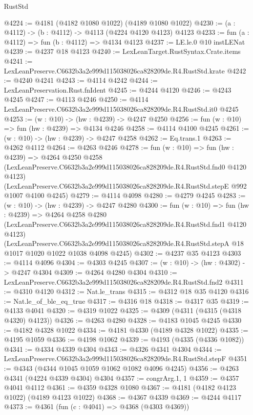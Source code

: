 \begin{lexlean}{RustStd}
\begin{coremodule}
@4224 := @4181 (@4182 @1080 @1022) (@4189 @1080 @1022)
@4230 := (a : @4112) -> (b : @4112) -> @4113 (@4224 @4120 @4123) @4123
@4233 := fun (a : @4112) => fun (b : @4112) => @4134 @4123
@4237 := LE.le.{0} @10 instLENat
@4239 := @4237 @18 @4123
@4240 := LexLeanTarget.RustSyntax.Crate.items
@4241 := LexLeanPreserve.C6632b3a2e999d115038026ca828209de.R4.RustStd.krate
@4242 := @4240 @4241
@4243 := @4114 @4242
@4244 := LexLeanPreservation.Rust.fnIdent
@4245 := @4244 @4120
@4246 := @4243 @4245
@4247 := @4113 @4246
@4250 := @4114 LexLeanPreserve.C6632b3a2e999d115038026ca828209de.R4.RustStd.it0 @4245
@4253 := (w : @10) -> (hw : @4239) -> @4247 @4250
@4256 := fun (w : @10) => fun (hw : @4239) => @4134 @4246
@4258 := @4114 @4100 @4245
@4261 := (w : @10) -> (hw : @4239) -> @4247 @4258
@4262 := Eq.trans.{1}
@4263 := @4262 @4112
@4264 := @4263 @4246
@4278 := fun (w : @10) =>
  fun (hw : @4239) =>
  @4264
    @4250
    @4258
    (LexLeanPreserve.C6632b3a2e999d115038026ca828209de.R4.RustStd.fnd0 @4120 @4123)
    (LexLeanPreserve.C6632b3a2e999d115038026ca828209de.R4.RustStd.stepE @992 @1007 @4100 @4245)
@4279 := @4114 @4098
@4280 := @4279 @4245
@4283 := (w : @10) -> (hw : @4239) -> @4247 @4280
@4300 := fun (w : @10) =>
  fun (hw : @4239) =>
  @4264
    @4258
    @4280
    (LexLeanPreserve.C6632b3a2e999d115038026ca828209de.R4.RustStd.fnd1 @4120 @4123)
    (LexLeanPreserve.C6632b3a2e999d115038026ca828209de.R4.RustStd.stepA
      @18
      @1017
      @1020
      @1022
      @1038
      @4098
      @4245)
@4302 := @4237 @35 @4123
@4303 := @4114 @4096
@4304 := @4303 @4245
@4307 := (w : @10) -> (hw : @4302) -> @4247 @4304
@4309 := @4264 @4280 @4304
@4310 := LexLeanPreserve.C6632b3a2e999d115038026ca828209de.R4.RustStd.fnd2
@4311 := @4310 @4120
@4312 := Nat.le_trans
@4315 := @4312 @18 @35 @4120
@4316 := Nat.le_of_ble_eq_true
@4317 := @4316 @18
@4318 := @4317 @35
@4319 := @4133 @4041
@4320 := @4319 @1022
@4325 := @4309 (@4311 (@4315 (@4318 @4320) @4123))
@4326 := @4263 @4280
@4328 := @4183 @1045 @4245
@4330 := @4182 @4328 @1022
@4334 := @4181 @4330 (@4189 @4328 @1022)
@4335 := @4195 @1059
@4336 := @4198 @1062
@4339 := @4193 (@4335 (@4336 @1082))
@4341 := @4334 @4339 @4304
@4343 := @4326 @4341 @4304
@4344 := LexLeanPreserve.C6632b3a2e999d115038026ca828209de.R4.RustStd.stepF
@4351 := @4343 (@4344 @1045 @1059 @1062 @1082 @4096 @4245)
@4356 := @4263 @4341 (@4224 @4339 @4304) @4304
@4357 := congrArg.{1, 1}
@4359 := @4357 @4041 @4112
@4361 := @4359 @4328 @1080
@4367 := @4181 (@4182 @4123 @1022) (@4189 @4123 @1022)
@4368 := @4367 @4339
@4369 := @4244 @4117
@4373 := @4361 (fun (c : @4041) => @4368 (@4303 @4369))

\end{coremodule}
\end{lexlean}

